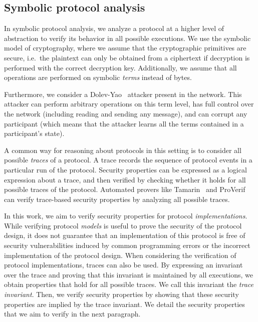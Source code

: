 \subsection{Symbolic protocol analysis}
\label{sec:symbolic-protocol-analysis}

In symbolic protocol analysis, we analyze a protocol at a higher level of abstraction to verify its behavior in all possible executions.
We use the symbolic model of cryptography, where we assume that the cryptographic primitives are secure, i.e.\ the plaintext can only be obtained from a ciphertext if decryption is performed with the correct decryption key.
Additionally, we assume that all operations are performed on symbolic \emph{terms} instead of bytes.%

Furthermore, we consider a Dolev-Yao~\cite{dolev1983security} attacker present in the network. This attacker can perform arbitrary operations on this term level, has full control over the network (including reading and sending any message), and can corrupt any participant (which means that the attacker learns all the terms contained in a participant's state).

A common way for reasoning about protocols in this setting is to consider all possible \emph{traces} of a protocol.
A trace records the sequence of protocol events in a particular run of the protocol.
Security properties can be expressed as a logical expression about a trace, and then verified by checking whether it holds for all possible traces of the protocol.
Automated provers like Tamarin~\cite{meier2013tamarin} and ProVerif~\cite{blanchet2016modeling} can verify trace-based security properties by analyzing all possible traces.

In this work, we aim to verify security properties for protocol \emph{implementations}.
While verifying protocol \emph{models} is useful to prove the security of the protocol design, it does not guarantee that an implementation of this protocol is free of security vulnerabilities induced by common programming errors or the incorrect implementation of the protocol design.
When considering the verification of protocol implementations, traces can also be used.
By expressing an invariant over the trace and proving that this invariant is maintained by all executions, we obtain properties that hold for all possible traces. 
We call this invariant the \emph{trace invariant}.
Then, we verify security properties by showing that these security properties are implied by the trace invariant.
We detail the security properties that we aim to verify in the next paragraph.

